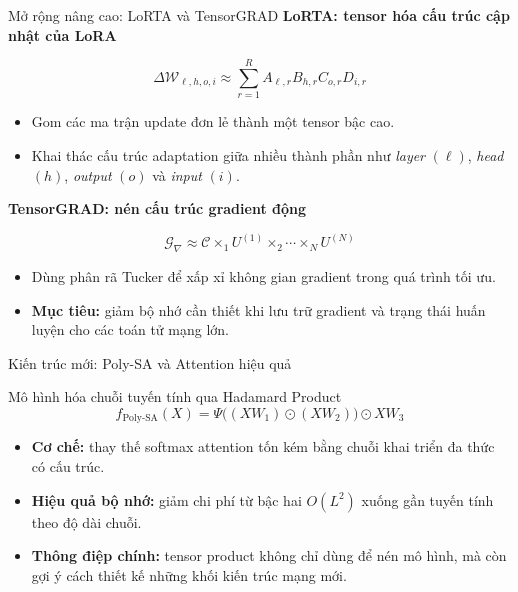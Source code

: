 \begin{frame}{Mở rộng nâng cao: LoRTA và TensorGRAD}
    \textbf{\color{blue}LoRTA: tensor hóa cấu trúc cập nhật của LoRA}

    \[
        \Delta\mathcal{W}_{\ell,h,o,i}
        \approx
        \sum_{r=1}^{R}
        A_{\ell,r}
        B_{h,r}
        C_{o,r}
        D_{i,r}
    \]

    \begin{itemize}
        \item Gom các ma trận update đơn lẻ thành một tensor bậc cao.
        \item Khai thác cấu trúc adaptation giữa nhiều thành phần như \textit{layer} $(\ell)$, \textit{head} $(h)$, \textit{output} $(o)$ và \textit{input} $(i)$.
    \end{itemize}

    \vspace{0.25cm}

    \textbf{\color{blue}TensorGRAD: nén cấu trúc gradient động}

    \[
        \mathcal{G}_{\nabla}
        \approx
        \mathcal{C}
        \times_1 U^{(1)}
        \times_2
        \cdots
        \times_N U^{(N)}
    \]

    \begin{itemize}
        \item Dùng phân rã Tucker để xấp xỉ không gian gradient trong quá trình tối ưu.
        \item \textbf{Mục tiêu:} giảm bộ nhớ cần thiết khi lưu trữ gradient và trạng thái huấn luyện cho các toán tử mạng lớn.
    \end{itemize}
\end{frame}


\begin{frame}{Kiến trúc mới: Poly-SA và Attention hiệu quả}
    \begin{block}{Mô hình hóa chuỗi tuyến tính qua Hadamard Product}
        \[
            f_{\mathrm{Poly\mbox{-}SA}}(X)
            =
            \Psi\big((XW_1) \odot (XW_2)\big)
            \odot
            XW_3
        \]
    \end{block}

    \begin{itemize}
        \item \textbf{Cơ chế:} thay thế softmax attention tốn kém bằng chuỗi khai triển đa thức có cấu trúc.
        \item \textbf{Hiệu quả bộ nhớ:} giảm chi phí từ bậc hai $O(L^2)$ xuống gần tuyến tính theo độ dài chuỗi.
        \item \textbf{Thông điệp chính:} tensor product không chỉ dùng để nén mô hình, mà còn gợi ý cách thiết kế những khối kiến trúc mạng mới.
    \end{itemize}
\end{frame}


